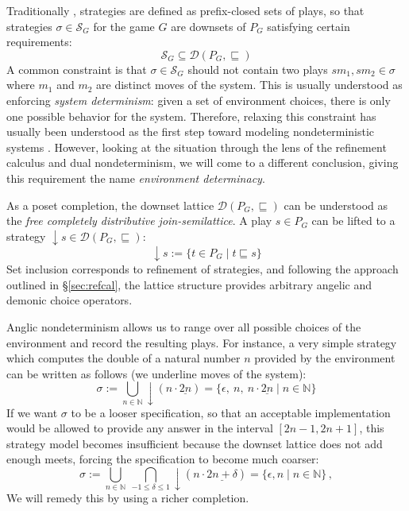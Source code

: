 \documentclass[format=sigplan,authordraft]{acmart}
\begin{document}
Traditionally \cite{gamesem99},
strategies are defined as
prefix-closed sets of plays,
so that strategies $\sigma \in \mathcal{S}_G$
for the game $G$ are downsets of $P_G$
satisfying certain requirements:
\[
    \mathcal{S}_G \subseteq
    \mathcal{D}(P_G, {\sqsubseteq})
\]
A common constraint is that $\sigma \in \mathcal{S}_G$
should not contain two plays $s m_1, s m_2 \in \sigma$
where $m_1$ and $m_2$ are distinct moves of the system.
This is usually understood as
enforcing \emph{system determinism}:
given a set of environment choices,
there is only one possible behavior for the system.
Therefore,
relaxing this constraint has usually been understood
as the first step toward modeling nondeterministic systems
\cite{gsfnd}.
However,
looking at the situation through the lens of
the refinement calculus and dual nondeterminism,
we will come to a different conclusion,
giving this requirement the name
\emph{environment determinacy}.

As a poset completion,
the downset lattice
$\mathcal{D}(P_G, {\sqsubseteq})$
can be understood as
the \emph{free completely distributive join-semilattice}.
A play $s \in P_G$ can be lifted to a strategy
${\downarrow} s \in \mathcal{D}(P_G, {\sqsubseteq})$:
\[
    {\downarrow} s := \{ t \in P_G \mid t \sqsubseteq s \}
\]
Set inclusion corresponds to refinement of strategies,
and following the approach outlined in \S\ref{sec:refcal},
the lattice structure provides
arbitrary angelic and demonic choice operators.

Anglic nondeterminism
allows us to range over all possible choices of the environment
and record the resulting plays.
For instance,
a very simple strategy which computes
the double of a natural number $n$
provided by the environment
can be written as follows
(we underline moves of the system):
\[
  \sigma :=
    \bigcup_{n \in \mathbb{N}} {\downarrow}(n \cdot \underline{2n}) =
    \{ \epsilon, \: n, \: n \cdot \underline{2n} \mid n \in \mathbb{N} \}
\]
If we want $\sigma$ to be a looser specification,
so that an acceptable implementation
would be allowed to provide any answer in the interval
$[2n - 1, 2n + 1]$,
this strategy model becomes insufficient
because the downset lattice does not add enough meets,
forcing the specification to become
much coarser:
\[
  \sigma :=
    \bigcup_{n \in \mathbb{N}} \:
    \bigcap_{-1 \le \delta \le 1}
    {\downarrow}(n \cdot \underline{2n+\delta}) =
    \{ \epsilon, n \mid n \in \mathbb{N} \} \,,
\]
We will remedy this by using a richer completion.

\end{document}
